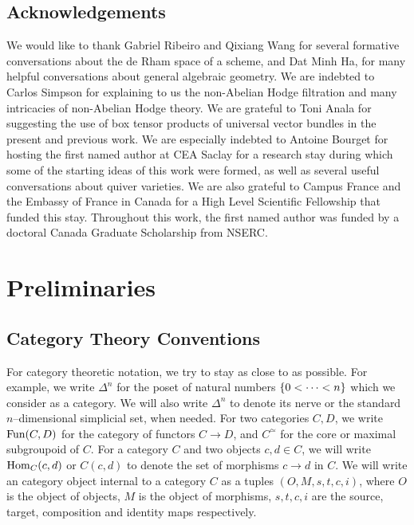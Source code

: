 \documentclass[11pt]{amsart}
\begin{document}
\subsection*{Acknowledgements}

We would like to thank Gabriel Ribeiro and Qixiang Wang for several
formative conversations about the de Rham space of a scheme, and Dat Minh Ha,
for many helpful conversations about general algebraic geometry. We are
indebted to Carlos Simpson for explaining to us the non-Abelian Hodge
filtration and many intricacies of non-Abelian Hodge theory. We are grateful to
Toni Anala for suggesting the use of box tensor products
of universal vector bundles in the present and previous work. We are especially
indebted to Antoine Bourget for hosting the first named author at CEA Saclay for
a research stay during which some of the starting ideas of this work were formed,
as well as several useful conversations about quiver varieties. We are also
grateful to Campus France and the Embassy of France in Canada for a High Level
Scientific Fellowship that funded this stay. Throughout this work, the first
named author was funded by a doctoral Canada Graduate Scholarship from NSERC.


\section{Preliminaries}\label{sec:Prelim}

\subsection{Category Theory Conventions}

For category theoretic notation, we try to stay as close to \cite{HTT} as
possible. For example, we write $\Delta^n$ for the poset of natural numbers
$\set{0 < \dots < n}$ which we consider as a category. We will also write
$\Delta^n$ to denote its nerve or the standard $n$--dimensional
simplicial set, when needed.
For two categories $C, D$, we write $\mathrm{Fun}(C, D)$ for the
category of functors $C \to D$, and $C^\simeq$ for the core or maximal
subgroupoid of $C$. For a category $C$ and two objects
$c, d \in C$, we will write $\mathrm{Hom}_C(c, d)$ or $C(c, d)$ to denote
the set of morphisms $c \to d$ in $C$.
We will write an category object internal to a category $C$
as a tuples $(O, M, s, t, c, i)$, where $O$ is the object of objects,
$M$ is the object of morphisms, $s, t, c, i$ are the source, target,
composition and identity maps respectively.
\end{document}
